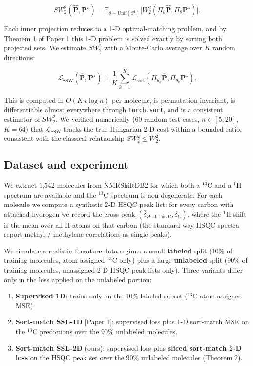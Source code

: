 \documentclass[11pt,a4paper]{article}
\providecommand{\tightlist}{\setlength{\itemsep}{0pt}\setlength{\parskip}{0pt}}
\begin{document}
\[SW_2^2(\hat{\mathbf{P}}, \mathbf{P}^\star) = \mathbb{E}_{\theta \sim \mathrm{Unif}(S^1)}\big[ W_2^2(\Pi_\theta \hat{\mathbf{P}}, \Pi_\theta \mathbf{P}^\star) \big].\]

Each inner projection reduces to a 1-D optimal-matching problem, and by Theorem 1 of Paper 1 this 1-D problem is solved exactly by sorting both projected sets. We estimate \(SW_2^2\) with a Monte-Carlo average over \(K\) random directions:

\[\mathcal{L}_{\mathrm{SSW}}(\hat{\mathbf{P}}, \mathbf{P}^\star) = \frac{1}{K} \sum_{k=1}^K \mathcal{L}_{\mathrm{sort}}(\Pi_{\theta_k}\hat{\mathbf{P}}, \Pi_{\theta_k}\mathbf{P}^\star).\]

This is computed in \(O(K n \log n)\) per molecule, is permutation-invariant, is differentiable almost everywhere through \texttt{torch.sort}, and is a consistent estimator of \(SW_2^2\). We verified numerically (60 random test cases, \(n \in [5, 20]\), \(K = 64\)) that \(\mathcal{L}_{\mathrm{SSW}}\) tracks the true Hungarian 2-D cost within a bounded ratio, consistent with the classical relationship \(SW_2^2 \leq W_2^2\).

\subsection{Dataset and experiment}\label{dataset-and-experiment}

We extract 1,542 molecules from NMRShiftDB2 for which both a \(^{13}\)C and a \(^{1}\)H spectrum are available and the \(^{13}\)C spectrum is non-degenerate. For each molecule we compute a synthetic 2-D HSQC peak list: for every carbon with attached hydrogen we record the cross-peak \((\bar{\delta}_{H,\text{at this C}}, \delta_{C})\), where the \(^{1}\)H shift is the mean over all H atoms on that carbon (the standard way HSQC spectra report methyl / methylene correlations as single peaks).

We simulate a realistic literature data regime: a small \textbf{labeled} split (10\% of training molecules, atom-assigned \(^{13}\)C only) plus a large \textbf{unlabeled} split (90\% of training molecules, unassigned 2-D HSQC peak lists only). Three variants differ only in the loss applied on the unlabeled portion:

\begin{enumerate}
\def\labelenumi{\arabic{enumi}.}
\tightlist
\item
  \textbf{Supervised-1D}: trains only on the 10\% labeled subset (\(^{13}\)C atom-assigned MSE).
\item
  \textbf{Sort-match SSL-1D} {[}Paper 1{]}: supervised loss plus 1-D sort-match MSE on the \(^{13}\)C predictions over the 90\% unlabeled molecules.
\item
  \textbf{Sort-match SSL-2D} (ours): supervised loss plus \textbf{sliced sort-match 2-D loss} on the HSQC peak set over the 90\% unlabeled molecules (Theorem 2).
\end{enumerate}
\end{document}
